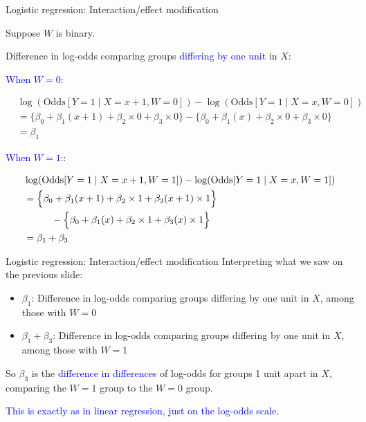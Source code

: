 \documentclass[10pt,t]{beamer}
\newcommand\tab[1][1cm]{\hspace*{#1}}
\begin{document}
\begin{frame}{Logistic regression: Interaction/effect modification}
	\vspace{-5 mm}
	
	Suppose $W$ is binary. 
	
	\bigskip
	
	Difference in log-odds comparing groups \textcolor{blue}{differing by one unit} in $X$: 
	
	\bigskip
	
	\textcolor{blue}{When $W = 0$}:
	\begin{small}
		\begin{align*}
		&\log(\text{Odds}[Y = 1 \mid X = x+1, W = 0]) - \log(\text{Odds}[Y = 1 \mid X = x, W = 0])\\
		&= \Big\{\beta_0 + \beta_1(x + 1) + \beta_2\times 0 + \beta_3 \times 0 \Big\}- \Big\{\beta_0 + \beta_1(x) + \beta_2\times 0 + \beta_3 \times 0\Big\}\\
		&= \beta_1 
		\end{align*}
	\end{small} 



	\textcolor{blue}{When $W = 1$}::
	\begin{small}
		\begin{align*}
		&\log(\text{Odds}[Y = 1 \mid X = x+1, W = 1]) - \log(\text{Odds}[Y = 1 \mid X = x, W = 1])\\
		&= \Big\{\beta_0 + \beta_1(x + 1) + \beta_2\times 1 + \beta_3(x+1) \times 1 \Big\}\\
		&\tab - \Big\{\beta_0 + \beta_1(x) + \beta_2\times 1 + \beta_3 (x)\times 1\Big\}\\
		&= \beta_1 + \beta_3
		\end{align*}
	\end{small}
\end{frame}

\begin{frame}{Logistic regression: Interaction/effect modification}
	Interpreting what we saw on the previous slide:  
	
	\medskip
	
	\begin{itemize}
		\item $\beta_1$: Difference in log-odds comparing groups differing by one unit in $X$, among those with $W = 0$ 
		
		\medskip
		
		\item $\beta_1 + \beta_3$: Difference in log-odds comparing groups differing by one unit in $X$, among those with $W = 1$ 
	\end{itemize}

\bigskip

	So $\beta_3$ is the \textcolor{blue}{difference in differences} of log-odds for groups 1 unit apart in $X$, comparing the $W = 1$ group to the $W = 0$ group. 
	
	\bigskip
	
	\textcolor{blue}{This is exactly as in linear regression, just on the log-odds scale.}
\end{frame}
\end{document}

